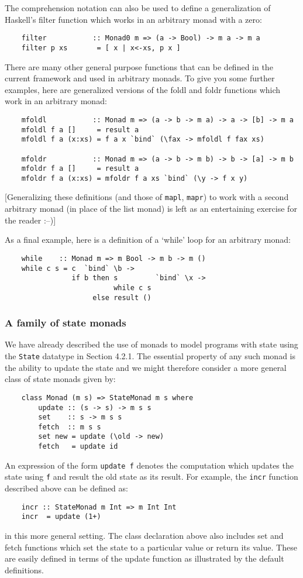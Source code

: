 The comprehension notation can also be used to define a generalization
of Haskell's filter function which works in an arbitrary monad with a
zero:
\begin{verbatim}
    filter           :: Monad0 m => (a -> Bool) -> m a -> m a
    filter p xs       = [ x | x<-xs, p x ]
\end{verbatim}
There are many other general purpose functions that can be defined
in the current framework and used in arbitrary monads.  To give you
some further examples, here are generalized versions of the foldl and
foldr functions which work in an arbitrary monad:
\begin{verbatim}
    mfoldl           :: Monad m => (a -> b -> m a) -> a -> [b] -> m a
    mfoldl f a []     = result a
    mfoldl f a (x:xs) = f a x `bind` (\fax -> mfoldl f fax xs)

    mfoldr           :: Monad m => (a -> b -> m b) -> b -> [a] -> m b
    mfoldr f a []     = result a
    mfoldr f a (x:xs) = mfoldr f a xs `bind` (\y -> f x y)
\end{verbatim}
[Generalizing these definitions (and those of \verb"mapl", \verb"mapr") to work with
a second arbitrary monad (in place of the list monad) is left as an
entertaining exercise for the reader :--)]

As a final example, here is a definition of a `while' loop for an
arbitrary monad:
\begin{verbatim}
    while    :: Monad m => m Bool -> m b -> m ()
    while c s = c  `bind` \b ->
                if b then s         `bind` \x ->
                          while c s
                     else result ()
\end{verbatim}

\subsubsection{A family of state monads}
We have already described the use of monads to model programs with
state using the \verb"State" datatype in Section 4.2.1.  The essential
property of any such monad is the ability to update the state and we
might therefore consider a more general class of state monads given by:
\begin{verbatim}
    class Monad (m s) => StateMonad m s where
        update :: (s -> s) -> m s s
        set    :: s -> m s s
        fetch  :: m s s
        set new = update (\old -> new)
        fetch   = update id
\end{verbatim}
An expression of the form \verb"update f" denotes the computation which
updates the state using \verb"f" and result the old state as its result.  For
example, the \verb"incr" function described above can be defined as:
\begin{verbatim}
    incr :: StateMonad m Int => m Int Int
    incr  = update (1+)
\end{verbatim}
in this more general setting.  The class declaration above also
includes set and fetch functions which set the state to a particular
value or return its value.  These are easily defined in terms of the
update function as illustrated by the default definitions.

